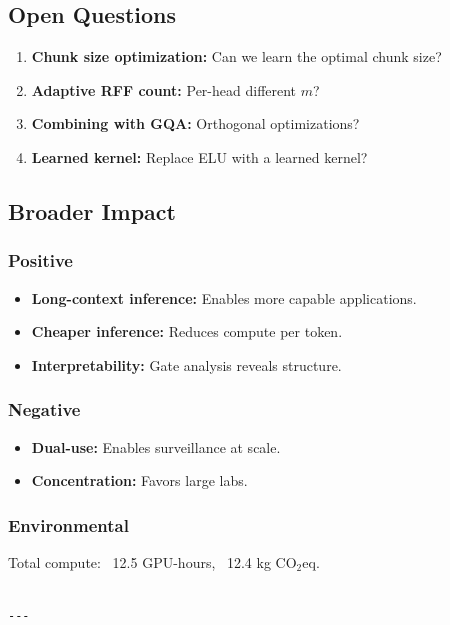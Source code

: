 \subsection{Open Questions}

\begin{enumerate}
\item \textbf{Chunk size optimization:} Can we learn the optimal chunk size?
\item \textbf{Adaptive RFF count:} Per-head different $m$?
\item \textbf{Combining with GQA:} Orthogonal optimizations?
\item \textbf{Learned kernel:} Replace ELU with a learned kernel?

\end{enumerate}
\subsection{Broader Impact}

\subsubsection{Positive}
\begin{itemize}
\item \textbf{Long-context inference:} Enables more capable applications.
\item \textbf{Cheaper inference:} Reduces compute per token.
\item \textbf{Interpretability:} Gate analysis reveals structure.

\end{itemize}
\subsubsection{Negative}
\begin{itemize}
\item \textbf{Dual-use:} Enables surveillance at scale.
\item \textbf{Concentration:} Favors large labs.

\end{itemize}
\subsubsection{Environmental}
Total compute: ~12.5 GPU-hours, ~12.4 kg CO$_2$eq.
\begin{lstlisting}

---
\end{lstlisting}